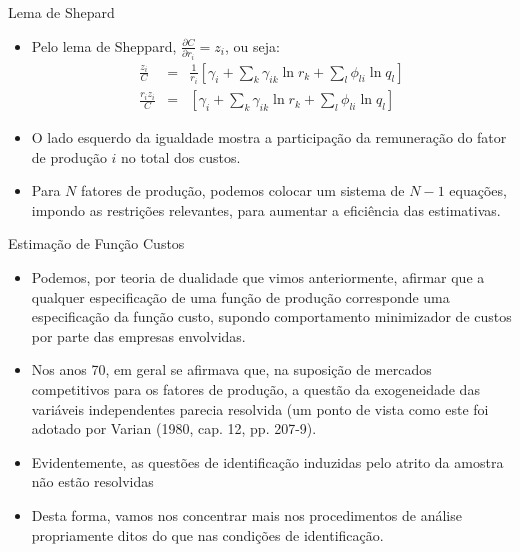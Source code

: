 \documentclass{beamer}
\begin{document}
\begin{frame}{Lema de Shepard}

\begin{itemize}
\item Pelo lema de Sheppard, $\frac{\partial C}{\partial r_{i}}=z_{i}$,
ou seja:
\begin{eqnarray*}
\frac{z_{i}}{C} & = & \frac{1}{r_{i}}\left[\gamma_{i}+\sum_{k}\gamma_{ik}\ln r_{k}+\sum_{l}\phi_{li}\ln q_{l}\right]\\
\frac{r_{i}z_{i}}{C} & = & \left[\gamma_{i}+\sum_{k}\gamma_{ik}\ln r_{k}+\sum_{l}\phi_{li}\ln q_{l}\right]
\end{eqnarray*}
\item O lado esquerdo da igualdade mostra a participação da remuneração
do fator de produção $i$ no total dos custos. 
\item Para $N$ fatores de produção, podemos colocar um sistema de $N-1$
equações, impondo as restrições relevantes, para aumentar a eficiência
das estimativas.
\end{itemize}
\end{frame}

\begin{frame}{Estimação de Função Custos}

\begin{itemize}
\item Podemos, por teoria de dualidade que vimos anteriormente, afirmar
que a qualquer especificação de uma função de produção corresponde
uma especificação da função custo, supondo comportamento minimizador
de custos por parte das empresas envolvidas. 
\item Nos anos 70, em geral se afirmava que, na suposição de mercados competitivos
para os fatores de produção, a questão da exogeneidade das variáveis
independentes parecia resolvida (um ponto de vista como este foi adotado
por Varian (1980, cap. 12, pp. 207-9). 
\item Evidentemente, as questões de identificação induzidas pelo atrito
da amostra não estão resolvidas
\item Desta forma, vamos nos concentrar mais nos procedimentos de análise
propriamente ditos do que nas condições de identificação.
\end{itemize}
\end{frame}
\end{document}
